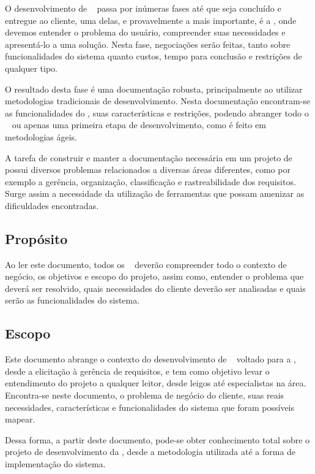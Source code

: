 
O desenvolvimento de \sw~ passa por inúmeras fases até que seja concluído e entregue ao cliente, uma delas, e provavelmente a mais importante, é a \er, onde devemos entender o problema do usuário, compreender suas necessidades e apresentá-lo a uma solução. Nesta fase, negociações serão feitas, tanto sobre funcionalidades do sistema quanto custos, tempo para conclusão e restrições de qualquer tipo.

O resultado desta fase é uma documentação robusta, principalmente ao utilizar metodologias tradicionais de desenvolvimento. Nesta documentação encontram-se as funcionalidades do \sw, suas características e restrições, podendo abranger todo o \sw~ ou apenas uma primeira etapa de desenvolvimento, como é feito em metodologias ágeis.

A tarefa de construir e manter a documentação necessária em um projeto de \sw~ possui diversos problemas relacionados a diversas áreas diferentes, como por exemplo a gerência, organização, classificação e rastreabilidade dos requisitos. Surge assim a necessidade da utilização de ferramentas que possam amenizar as dificuldades encontradas.

\subsection{Propósito}

Ao ler este documento, todos os \stakeholder~ deverão compreender todo o contexto de negócio, os objetivos e escopo do projeto, assim como, entender o problema que deverá ser resolvido, quais necessidades do cliente deverão ser analisadas e quais serão as funcionalidades do sistema.

\subsection{Escopo}

Este documento abrange o contexto do desenvolvimento de \sw~ voltado para a \er, desde a elicitação à gerência de requisitos, e tem como objetivo levar o entendimento do projeto a qualquer leitor, desde leigos até especialistas na área. Encontra-se neste documento, o problema de negócio do cliente, suas reais necessidades, características e funcionalidades do sistema que foram possíveis mapear.

Dessa forma, a partir deste documento, pode-se obter conhecimento total sobre o projeto de desenvolvimento da \nomeferramenta, desde a metodologia utilizada até a forma de implementação do sistema.


